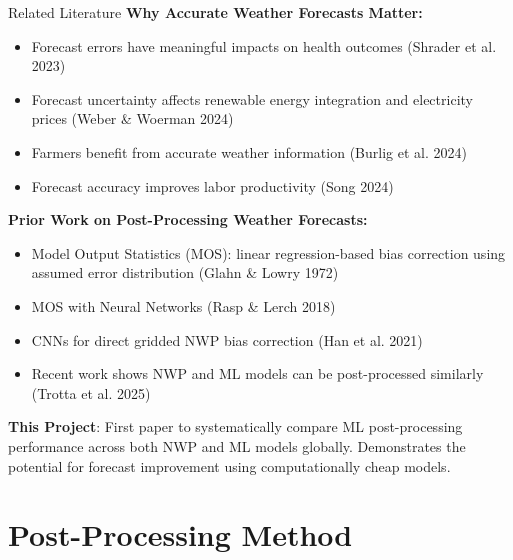 \documentclass[aspectratio=169, xcolor=dvipsnames]{beamer}
\begin{document}
\begin{frame}{Related Literature}
    \textbf{Why Accurate Weather Forecasts Matter:}
    \begin{itemize}
        \item Forecast errors have meaningful impacts on health outcomes (Shrader et al. 2023)
        \item Forecast uncertainty affects renewable energy integration and electricity prices (Weber \& Woerman 2024)
        \item Farmers benefit from accurate weather information (Burlig et al. 2024)
        \item Forecast accuracy improves labor productivity (Song 2024)
    \end{itemize}
    \pause

    \textbf{Prior Work on Post-Processing Weather Forecasts:}
    \begin{itemize}
        \item Model Output Statistics (MOS): linear regression-based bias correction using assumed error distribution (Glahn \& Lowry 1972) 
        \item MOS with Neural Networks (Rasp \& Lerch 2018)
        \item CNNs for direct gridded NWP bias correction (Han et al. 2021)
        \item Recent work shows NWP and ML models can be post-processed similarly (Trotta et al. 2025)
    \end{itemize}
    \pause
\textbf{This Project}: First paper to systematically compare ML post-processing performance across both NWP and ML models globally. Demonstrates the potential for forecast improvement using computationally cheap models.
\end{frame}

\section{Post-Processing Method}
\end{document}
